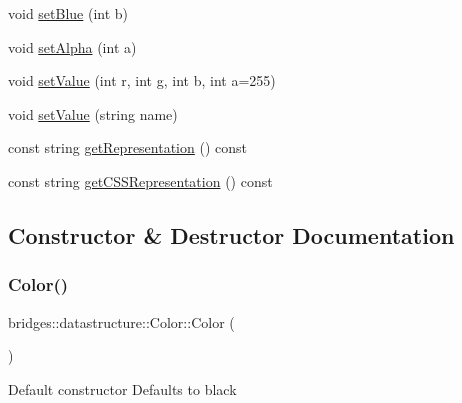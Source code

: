 \begin{DoxyCompactItemize}
\item 
void \hyperlink{classbridges_1_1datastructure_1_1_color_a829b0b914125ee30ce3d3e45a52a45c1}{set\+Blue} (int b)
\item 
void \hyperlink{classbridges_1_1datastructure_1_1_color_a19ff34702143ec54248438dfad02e4a2}{set\+Alpha} (int a)
\item 
void \hyperlink{classbridges_1_1datastructure_1_1_color_aa23d4b981b994b4065f904195ffd8595}{set\+Value} (int r, int g, int b, int a=255)
\item 
void \hyperlink{classbridges_1_1datastructure_1_1_color_ad6c95830bb6d69d39624f3989127aa93}{set\+Value} (string name)
\item 
const string \hyperlink{classbridges_1_1datastructure_1_1_color_a2ebb4e803c935cf151e3309700f3978d}{get\+Representation} () const
\item 
const string \hyperlink{classbridges_1_1datastructure_1_1_color_ab4916e855078346c3ac97eb6448e3e2b}{get\+C\+S\+S\+Representation} () const
\end{DoxyCompactItemize}


\subsection{Constructor \& Destructor Documentation}
\mbox{\label{classbridges_1_1datastructure_1_1_color_ad6b8b6b89a54ebea80d211679e10be3e}} 
\subsubsection{\texorpdfstring{Color()}{Color()}\hspace{0.1cm}{\footnotesize\ttfamily [1/3]}}
{\footnotesize\ttfamily bridges\+::datastructure\+::\+Color\+::\+Color (\begin{DoxyParamCaption}{ }\end{DoxyParamCaption})\hspace{0.3cm}{\ttfamily [inline]}}

Default constructor Defaults to black \mbox{\label{classbridges_1_1datastructure_1_1_color_a5f4cd55fae020f97b8715dc42475d0c1}} 
